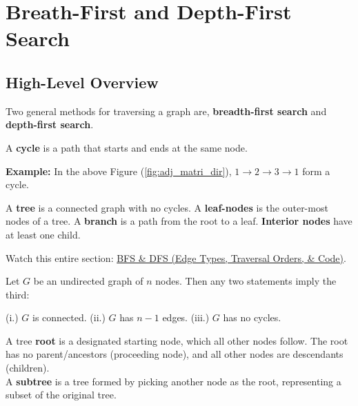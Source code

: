 \vspace{-1em}
\section{Breath-First and Depth-First Search}
\subsection{High-Level Overview}
Two general methods for traversing a graph are, \textbf{breadth-first search} and \textbf{depth-first search}.

\label{sec:bfs_dfs}
\begin{Def}[Cycle]

    A \textbf{cycle} is a path that starts and ends at the same node.
\end{Def}
\textbf{Example:} In the above Figure (\ref{fig:adj_matri_dir}), $1\rightarrow 2 \rightarrow 3 \rightarrow 1$ form a cycle.
\begin{Def}[Trees]

    A \textbf{tree} is a connected graph with no cycles. A \textbf{leaf-nodes} is the outer-most nodes of a tree. A \textbf{branch} is a path from the root to a leaf.
    \textbf{Interior nodes} have at least one child.  
\end{Def}

\begin{Tip}
Watch this entire section: \href{https://youtu.be/xHYS6IdpaDc?feature=shared}{BFS \& DFS (Edge Types, Traversal Orders, \& Code)}.
\end{Tip}
\newpage
\begin{theo}

    Let $G$ be an undirected graph of $n$ nodes. Then any two statements imply the third:
    \begin{center}

        \noindent
        (i.) $G$ is connected. \quad
        (ii.) $G$ has $n-1$ edges. \quad
        (iii.) $G$ has no cycles.
    \end{center}
\end{theo}

\begin{Def}

        A tree \textbf{root} is a designated starting node, which all other nodes follow. The root has
        no parent/ancestors (proceeding node), and all other nodes are descendants (children).\\

        \noindent
        A \textbf{subtree} is a tree formed by picking another node as the root, representing a subset of 
        the original tree.
\end{Def}


